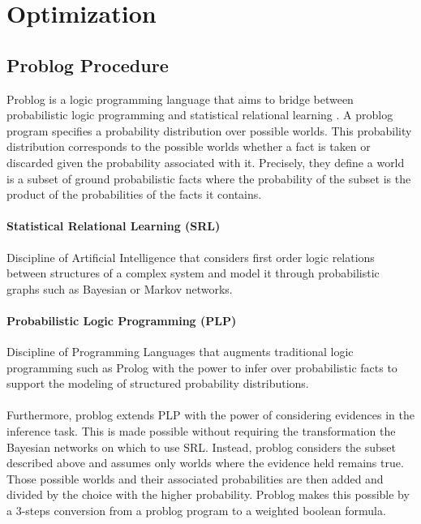 \section{Optimization} \label{optimality} 

\subsection{Problog Procedure} 
Problog is a logic programming language that aims to bridge between probabilistic 
logic programming and statistical relational learning \cite{fierens_van}. 
A problog program specifies a probability distribution over possible worlds. 
This probability distribution corresponds to the possible worlds whether a fact is taken 
or discarded given the probability associated with it. Precisely, they define a world 
is a subset of ground probabilistic facts where the probability of the subset is the product of 
the probabilities of the facts it contains.

\paragraph{Statistical Relational Learning (SRL)}
    Discipline of Artificial Intelligence that considers first order logic relations between 
    structures of a complex system and model it through probabilistic graphs such as Bayesian or 
    Markov networks.

\paragraph{Probabilistic Logic Programming (PLP)}
    Discipline of Programming Languages that augments traditional logic programming such as Prolog 
    with the power to infer over probabilistic facts to support the modeling of structured 
    probability distributions.


\paragraph{}
Furthermore, problog extends PLP with the power of considering evidences 
in the inference task. This is made possible without requiring the transformation 
the Bayesian networks on which to use SRL. Instead, problog considers the subset described above 
and assumes only worlds where the evidence held remains true. Those possible worlds and their associated 
probabilities are then added and divided by the choice with the higher probability. Problog makes this 
possible by a 3-steps conversion from a problog program to a weighted boolean formula.

